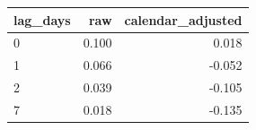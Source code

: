 \begin{tabular}{lrr}
\toprule
lag\_days & raw & calendar\_adjusted \\
\midrule
0 & 0.100 & 0.018 \\
1 & 0.066 & -0.052 \\
2 & 0.039 & -0.105 \\
7 & 0.018 & -0.135 \\
\bottomrule
\end{tabular}
